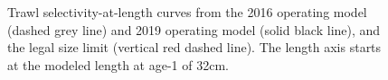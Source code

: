 \documentclass[11pt]{book}
\begin{document}
\newpage
\begin{figure}[htb]

{\centering {} 

}

\caption{Trawl selectivity-at-length curves from the 2016 operating model (dashed grey line) and 2019 operating model (solid black line), and the legal size limit (vertical red dashed line). The length axis starts at the modeled length at age-1 of 32cm.}\label{fig:unnamed-chunk-36}
\end{figure}
\MakeAvailable
\end{document}
